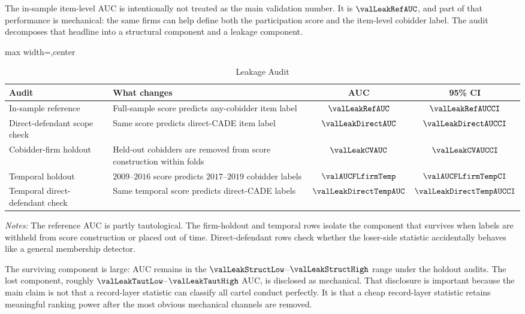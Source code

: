 The in-sample item-level AUC is intentionally not treated as the
main validation number. It is $\valLeakRefAUC$, and part of that
performance is mechanical: the same firms can help define both
the participation score and the item-level cobidder label. The
audit decomposes that headline into a structural component and a
leakage component.

\begin{table}[htbp]
\centering
\caption{Leakage Audit}
\label{tab:leakage_audit_v18}
\footnotesize
\begin{adjustbox}{max width=\textwidth,center}
\begin{threeparttable}
\begin{tabular}{p{4.4cm}p{5.4cm}cc}
\toprule
Audit & What changes & AUC & 95\% CI \\
\midrule
In-sample reference & Full-sample score predicts any-cobidder item label
& $\valLeakRefAUC$ & $\valLeakRefAUCCI$ \\
Direct-defendant scope check & Same score predicts direct-CADE item label
& $\valLeakDirectAUC$ & $\valLeakDirectAUCCI$ \\
Cobidder-firm holdout & Held-out cobidders are removed from score construction within folds
& $\valLeakCVAUC$ & $\valLeakCVAUCCI$ \\
Temporal holdout & $2009$--$2016$ score predicts $2017$--$2019$ cobidder labels
& $\valAUCFLfirmTemp$ & $\valAUCFLfirmTempCI$ \\
Temporal direct-defendant check & Same temporal score predicts direct-CADE labels
& $\valLeakDirectTempAUC$ & $\valLeakDirectTempAUCCI$ \\
\bottomrule
\end{tabular}
\begin{tablenotes}
\footnotesize
\item \textit{Notes:} The reference AUC is partly tautological.
The firm-holdout and temporal rows isolate the component that
survives when labels are withheld from score construction or
placed out of time. Direct-defendant rows check whether the
loser-side statistic accidentally behaves like a general
membership detector.
\end{tablenotes}
\end{threeparttable}
\end{adjustbox}
\end{table}

The surviving component is large: AUC remains in the
$\valLeakStructLow$--$\valLeakStructHigh$ range under the
holdout audits. The lost component, roughly
$\valLeakTautLow$--$\valLeakTautHigh$ AUC, is disclosed as
mechanical. That disclosure is important because the main claim
is not that a record-layer statistic can classify all cartel
conduct perfectly. It is that a cheap record-layer statistic
retains meaningful ranking power after the most obvious
mechanical channels are removed.

